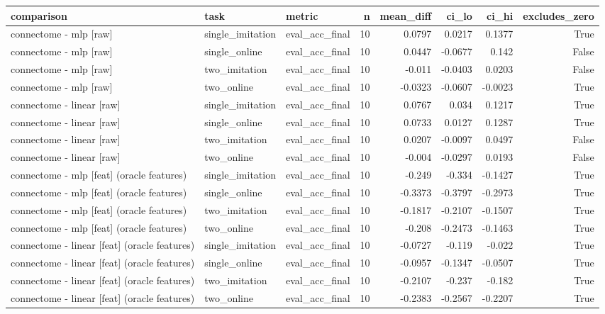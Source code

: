 \begin{table}[t]
\centering
\small
\begin{tabular}{lllrrrrr}
\toprule
comparison & task & metric & n & mean\_diff & ci\_lo & ci\_hi & excludes\_zero \\
\midrule
connectome - mlp [raw] & single\_imitation & eval\_acc\_final & 10 & 0.0797 & 0.0217 & 0.1377 & True \\
connectome - mlp [raw] & single\_online & eval\_acc\_final & 10 & 0.0447 & -0.0677 & 0.142 & False \\
connectome - mlp [raw] & two\_imitation & eval\_acc\_final & 10 & -0.011 & -0.0403 & 0.0203 & False \\
connectome - mlp [raw] & two\_online & eval\_acc\_final & 10 & -0.0323 & -0.0607 & -0.0023 & True \\
connectome - linear [raw] & single\_imitation & eval\_acc\_final & 10 & 0.0767 & 0.034 & 0.1217 & True \\
connectome - linear [raw] & single\_online & eval\_acc\_final & 10 & 0.0733 & 0.0127 & 0.1287 & True \\
connectome - linear [raw] & two\_imitation & eval\_acc\_final & 10 & 0.0207 & -0.0097 & 0.0497 & False \\
connectome - linear [raw] & two\_online & eval\_acc\_final & 10 & -0.004 & -0.0297 & 0.0193 & False \\
connectome - mlp [feat] (oracle features) & single\_imitation & eval\_acc\_final & 10 & -0.249 & -0.334 & -0.1427 & True \\
connectome - mlp [feat] (oracle features) & single\_online & eval\_acc\_final & 10 & -0.3373 & -0.3797 & -0.2973 & True \\
connectome - mlp [feat] (oracle features) & two\_imitation & eval\_acc\_final & 10 & -0.1817 & -0.2107 & -0.1507 & True \\
connectome - mlp [feat] (oracle features) & two\_online & eval\_acc\_final & 10 & -0.208 & -0.2473 & -0.1463 & True \\
connectome - linear [feat] (oracle features) & single\_imitation & eval\_acc\_final & 10 & -0.0727 & -0.119 & -0.022 & True \\
connectome - linear [feat] (oracle features) & single\_online & eval\_acc\_final & 10 & -0.0957 & -0.1347 & -0.0507 & True \\
connectome - linear [feat] (oracle features) & two\_imitation & eval\_acc\_final & 10 & -0.2107 & -0.237 & -0.182 & True \\
connectome - linear [feat] (oracle features) & two\_online & eval\_acc\_final & 10 & -0.2383 & -0.2567 & -0.2207 & True \\

\end{tabular}
\end{table}
